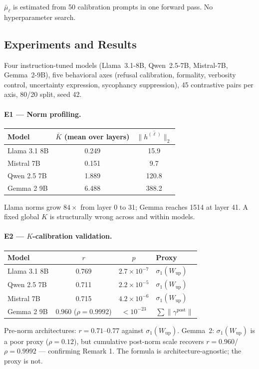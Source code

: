 \documentclass[11pt,a4paper]{article}
\begin{document}
$\bar{\mu}_\ell$ is estimated from 50 calibration prompts in one forward pass.
No hyperparameter search.

\subsection{Experiments and Results}
\label{sec:p1results}

Four instruction-tuned models (Llama~3.1-8B, Qwen~2.5-7B, Mistral-7B,
Gemma~2-9B), five behavioral axes (refusal calibration, formality, verbosity
control, uncertainty expression, sycophancy suppression), 45 contrastive pairs
per axis, 80/20 split, seed 42.

\paragraph{E1 — Norm profiling.}
\begin{center}\small
\begin{tabular}{lcc}
\toprule
Model & $\bar{K}$ (mean over layers) & $\overline{\|h^{(\ell)}\|_2}$ \\
\midrule
Llama 3.1 8B & 0.249 & 15.9 \\
Mistral 7B   & 0.151 & 9.7 \\
Qwen 2.5 7B  & 1.889 & 120.8 \\
Gemma 2 9B   & 6.488 & 388.2 \\
\bottomrule
\end{tabular}
\end{center}
Llama norms grow $84\times$ from layer 0 to 31; Gemma reaches 1514 at layer 41.
A fixed global $K$ is structurally wrong across and within models.

\paragraph{E2 — $K$-calibration validation.}
\begin{center}\small
\begin{tabular}{lccl}
\toprule
Model & $r$ & $p$ & Proxy \\
\midrule
Llama 3.1 8B & 0.769 & $2.7\!\times\!10^{-7}$ & $\sigma_1(W_\mathrm{up})$ \\
Qwen 2.5 7B  & 0.711 & $2.2\!\times\!10^{-5}$ & $\sigma_1(W_\mathrm{up})$ \\
Mistral 7B   & 0.715 & $4.2\!\times\!10^{-6}$ & $\sigma_1(W_\mathrm{up})$ \\
Gemma 2 9B   & $0.960$ ($\rho{=}0.9992$) & ${<}10^{-23}$ & $\sum\|\gamma^\mathrm{post}\|$ \\
\bottomrule
\end{tabular}
\end{center}
Pre-norm architectures: $r{=}0.71$--$0.77$ against $\sigma_1(W_\mathrm{up})$.
Gemma~2: $\sigma_1(W_\mathrm{up})$ is a poor proxy ($\rho{=}0.12$), but
cumulative post-norm scale recovers $r{=}0.960$/$\rho{=}0.9992$ — confirming
Remark 1.
The formula is architecture-agnostic; the proxy is not.
\end{document}
